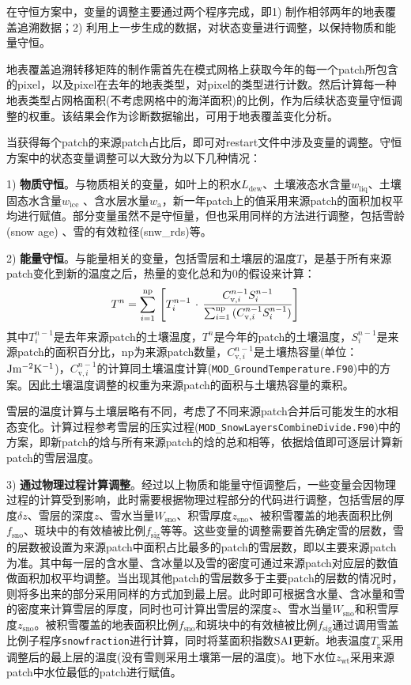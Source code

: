 在守恒方案中，变量的调整主要通过两个程序完成，即1) 制作相邻两年的地表覆盖追溯数据；2) 利用上一步生成的数据，对状态变量进行调整，以保持物质和能量守恒。

地表覆盖追溯转移矩阵的制作需首先在模式网格上获取今年的每一个patch所包含的pixel，以及pixel在去年的地表类型，对pixel的类型进行计数。然后计算每一种地表类型占网格面积(不考虑网格中的海洋面积)的比例，作为后续状态变量守恒调整的权重。该结果会作为诊断数据输出，可用于地表覆盖变化分析。

当获得每个patch的来源patch占比后，即可对restart文件中涉及变量的调整。守恒方案中的状态变量调整可以大致分为以下几种情况：


1) \textbf{物质守恒}。与物质相关的变量，如叶上的积水$L_{\mathrm{dew}}$、土壤液态水含量$w_{\mathrm{liq}}$、土壤固态水含量$w_{\mathrm{ice}}$
、含水层水量$w_{\mathrm{a}}$，新一年patch上的值采用来源patch的面积加权平均进行赋值。部分变量虽然不是守恒量，但也采用同样的方法进行调整，包括雪龄 (snow age) 、雪的有效粒径(snw\_rds)等。

2) \textbf{能量守恒}。与能量相关的变量，包括雪层和土壤层的温度$T$，是基于所有来源patch变化到新的温度之后，热量的变化总和为0的假设来计算：
\begin{equation}
  T^{n} = \sum_{i = 1}^{\rm np}{\,\left[ T_{i}^{n - 1}\,\cdot\,\frac{C_{\mathrm{v},i}^{n - 1} S_{i}^{n - 1}}{\sum_{i = 1}^{\rm np}{(C_{\mathrm{v},i}^{n - 1} S_{i}^{n - 1})}}\right]}
\end{equation}
其中\(T_{i}^{n - 1}\)是去年来源patch的土壤温度，\(T^{n}\)是今年的patch的土壤温度，\(S_{i}^{n - 1}\)是来源patch的面积百分比，np为来源patch数量，\(C_{\mathrm{v},i}^{n - 1}\)是土壤热容量(单位：\( \rm Jm^{-2}K^{-1}\))，\(C_{\mathrm{v},i}^{n - 1}\)的计算同土壤温度计算(\texttt{MOD\_GroundTemperature.F90})中的方案。因此土壤温度调整的权重为来源patch的面积与土壤热容量的乘积。

雪层的温度计算与土壤层略有不同，考虑了不同来源patch合并后可能发生的水相态变化。计算过程参考雪层的压实过程(\texttt{MOD\_SnowLayersCombineDivide.F90})中的方案，即新patch的焓与所有来源patch的焓的总和相等，依据焓值即可逐层计算新patch的雪层温度。

3) \textbf{通过物理过程计算调整}。经过以上物质和能量守恒调整后，一些变量会因物理过程的计算受到影响，此时需要根据物理过程部分的代码进行调整，包括雪层的厚度$\delta z$、雪层的深度$z$、雪水当量$W_{\mathrm{sno}}$、积雪厚度$z_{\mathrm{sno}}$、被积雪覆盖的地表面积比例$f_{\mathrm{sno}}$、斑块中的有效植被比例$f_{\mathrm{sig}}$等等。这些变量的调整需要首先确定雪的层数，雪的层数被设置为来源patch中面积占比最多的patch的雪层数，即以主要来源patch为准。其中每一层的含水量、含冰量以及雪的密度可通过来源patch对应层的数值做面积加权平均调整。当出现其他patch的雪层数多于主要patch的层数的情况时，则将多出来的部分采用同样的方式加到最上层。此时即可根据含水量、含冰量和雪的密度来计算雪层的厚度，同时也可计算出雪层的深度$z$、雪水当量$W_{\mathrm{sno}}$和积雪厚度$z_{\mathrm{sno}}$。被积雪覆盖的地表面积比例$f_{\mathrm{sno}}$和斑块中的有效植被比例$f_{\mathrm{sig}}$通过调用雪盖比例子程序\texttt{snowfraction}进行计算，同时将茎面积指数$\rm SAI$更新。地表温度$T_{\mathrm{g}}$采用调整后的最上层的温度(没有雪则采用土壤第一层的温度)。地下水位$z_{\mathrm{wt}}$采用来源patch中水位最低的patch进行赋值。

